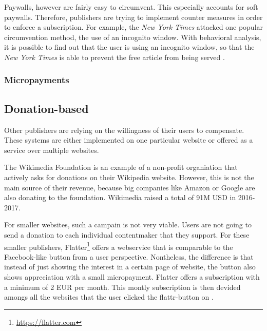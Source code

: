 
Paywalls, however are fairly easy to circumvent. This especially accounts for soft paywalls. Therefore, publishers are trying to implement counter measures in order to enforce a subscription. For example, the \textit{New York Times} attacked one popular circumvention method, the use of an incognito window. With behavioral analysis, it is possible to find out that the user is using an incognito window, so that the \textit{New York Times} is able to prevent the free article from being served \cite{troupson2015yes}.  

\subsubsection{Micropayments}



\subsection{Donation-based}

Other publishers are relying on the willingness of their users to compensate. These systems are either implemented on one particular website or offered as a service over multiple websites. 

The Wikimedia Foundation is an example of a non-profit organiation that actively asks for donations on their Wikipedia website. However, this is not the main source of their revenue, because big companies like Amazon or Google are also donating to the foundation. Wikimedia raised a total of 91M USD in 2016-2017. \cite{wikimediadonation}

For smaller websites, such a campain is not very viable. Users are not going to send a donation to each individual contentmaker that they support. For these smaller publishers, Flatter\footnote{\url{https://flatter.com}} offers a webservice that is comparable to the Facebook-like button from a user perspective. Nontheless, the difference is that instead of just showing the interest in a certain page of website, the button also shows appreciation with a small micropayment. Flatter offers a subscription with a minimum of 2 EUR per month. This montly subscription is then devided amongs all the websites that the user clicked the flattr-button on \cite{loll2010flattr}.







